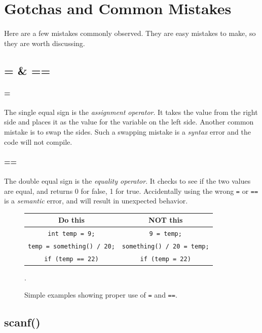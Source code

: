 \documentclass[letter,11pt]{article}
\begin{document}
\FloatBarrier
\newpage
\appendix
\section{Gotchas and Common Mistakes}
\paragraph{}Here are a few mistakes commonly observed. They are easy mistakes to make, so they are worth discussing.

\FloatBarrier
\subsection{= \& ==}
\paragraph{=}The single equal sign is the \textit{assignment operator}. It takes the value from the right side and places it as the value for the variable on the left side. Another common mistake is to swap the sides. Such a swapping mistake is a \textit{syntax} error and the code will not compile.

\paragraph{==}The double equal sign is the \textit{equality operator}. It checks to see if the two values are equal, and returns 0 for false, 1 for true. Accidentally using the wrong \texttt{=} or \texttt{==} is a \textit{semantic} error, and will result in unexpected behavior.

\begin{figure}[h!]
    \centering
    \begin{tabular}{c|c}
        Do this & NOT this \\ \hline
        \verb|int temp = 9;| & \verb|9 = temp;| \\
        \verb|temp = something() / 20;| & \verb|something() / 20 = temp;| \\
        \verb|if (temp == 22)| & \verb|if (temp = 22)|
    \end{tabular}
    \caption{Simple examples showing proper use of \texttt{=} and \texttt{==}.}.
    \label{fig:assignmentvsequality}
\end{figure}

\FloatBarrier
\subsection{scanf()}
\end{document}
